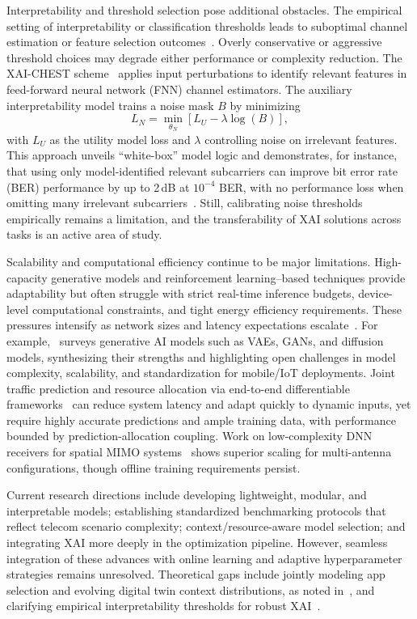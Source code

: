 \documentclass[sigconf]{acmart}
\begin{document}
Interpretability and threshold selection pose additional obstacles. The empirical setting of interpretability or classification thresholds leads to suboptimal channel estimation or feature selection outcomes~\cite{ref41}. Overly conservative or aggressive threshold choices may degrade either performance or complexity reduction. The XAI-CHEST scheme~\cite{ref38,ref41} applies input perturbations to identify relevant features in feed-forward neural network (FNN) channel estimators. The auxiliary interpretability model trains a noise mask $B$ by minimizing
\[
L_N = \min_{\theta_N} [ L_U - \lambda \log(B)],
\]
with $L_U$ as the utility model loss and $\lambda$ controlling noise on irrelevant features. This approach unveils “white-box” model logic and demonstrates, for instance, that using only model-identified relevant subcarriers can improve bit error rate (BER) performance by up to 2\,dB at $10^{-4}$ BER, with no performance loss when omitting many irrelevant subcarriers~\cite{ref38,ref41}. Still, calibrating noise thresholds empirically remains a limitation, and the transferability of XAI solutions across tasks is an active area of study.

Scalability and computational efficiency continue to be major limitations. High-capacity generative models and reinforcement learning–based techniques provide adaptability but often struggle with strict real-time inference budgets, device-level computational constraints, and tight energy efficiency requirements. These pressures intensify as network sizes and latency expectations escalate~\cite{ref43,ref44,ref48}. For example,~\cite{ref44} surveys generative AI models such as VAEs, GANs, and diffusion models, synthesizing their strengths and highlighting open challenges in model complexity, scalability, and standardization for mobile/IoT deployments. Joint traffic prediction and resource allocation via end-to-end differentiable frameworks~\cite{ref48} can reduce system latency and adapt quickly to dynamic inputs, yet require highly accurate predictions and ample training data, with performance bounded by prediction-allocation coupling. Work on low-complexity DNN receivers for spatial MIMO systems~\cite{ref43} shows superior scaling for multi-antenna configurations, though offline training requirements persist.

Current research directions include developing lightweight, modular, and interpretable models; establishing standardized benchmarking protocols that reflect telecom scenario complexity; context/resource-aware model selection; and integrating XAI more deeply in the optimization pipeline. However, seamless integration of these advances with online learning and adaptive hyperparameter strategies remains unresolved. Theoretical gaps include jointly modeling app selection and evolving digital twin context distributions, as noted in~\cite{ref37}, and clarifying empirical interpretability thresholds for robust XAI~\cite{ref38,ref41}. 
\end{document}
